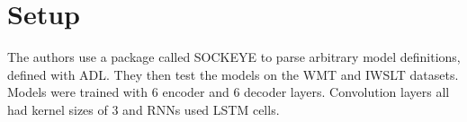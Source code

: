 \section{Setup}

The authors use a package called SOCKEYE to parse arbitrary model definitions,
defined with ADL. They then test the models on the WMT and IWSLT datasets.
Models were trained with 6 encoder and 6 decoder layers. Convolution layers all
had kernel sizes of 3 and RNNs used LSTM cells.
